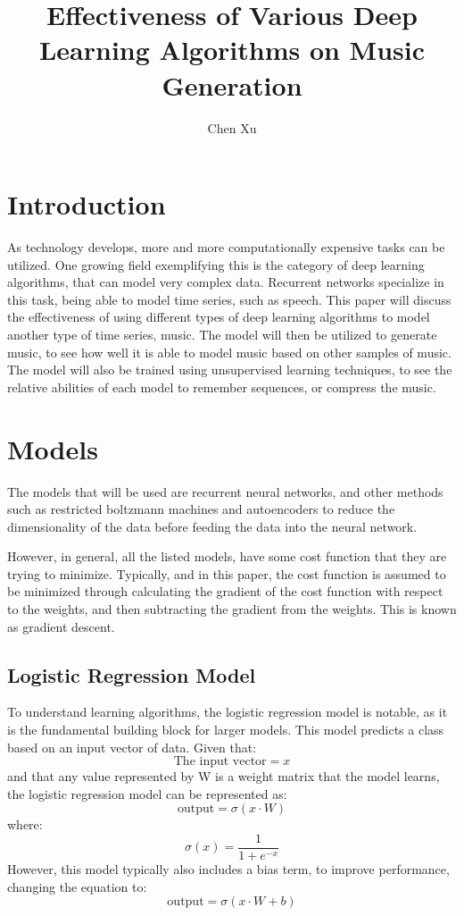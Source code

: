 \documentclass{article}
\begin{document}
\author{Chen Xu}
\title{Effectiveness of Various Deep Learning Algorithms on Music Generation}
\maketitle

\section{Introduction}
As technology develops, more and more computationally expensive tasks can be
utilized. One growing field exemplifying this is the category of deep learning
algorithms, that can model very complex data.  Recurrent networks specialize in
this task, being able to model time series, such as speech. This paper will
discuss the effectiveness of using different types of deep learning algorithms
to model another type of time series, music. The model will then be utilized to
generate music, to see how well it is able to model music based on other samples
of music. The model will also be trained using unsupervised learning techniques,
to see the relative abilities of each model to remember sequences, or compress
the music.

\section{Models}
The models that will be used are recurrent neural networks, and other methods
such as restricted boltzmann machines and autoencoders to reduce the
dimensionality of the data before feeding the data into the neural network.

However, in general, all the listed models, have some cost function that they
are trying to minimize. Typically, and in this paper, the cost function is
assumed to be minimized through calculating the gradient of the cost function
with respect to the weights, and then subtracting the gradient from the weights.
This is known as gradient descent.

\subsection{Logistic Regression Model}
To understand learning algorithms, the logistic regression model is notable, as
it is the fundamental building block for larger models. This model predicts a
class based on an input vector of data. Given that: 
$$ \textrm{The input vector} = x$$
and that any value represented by W is a weight matrix that the model learns,
the logistic regression model can be represented as:
$$ \textrm{output} = \sigma(x\cdot W) $$
where:
$$\sigma(x) = \frac{1}{1 + e^{-x}} $$
However, this model typically also includes a bias term, to improve performance,
changing the equation to:
$$ \textrm{output} = \sigma(x\cdot W + b) $$
\end{document}

